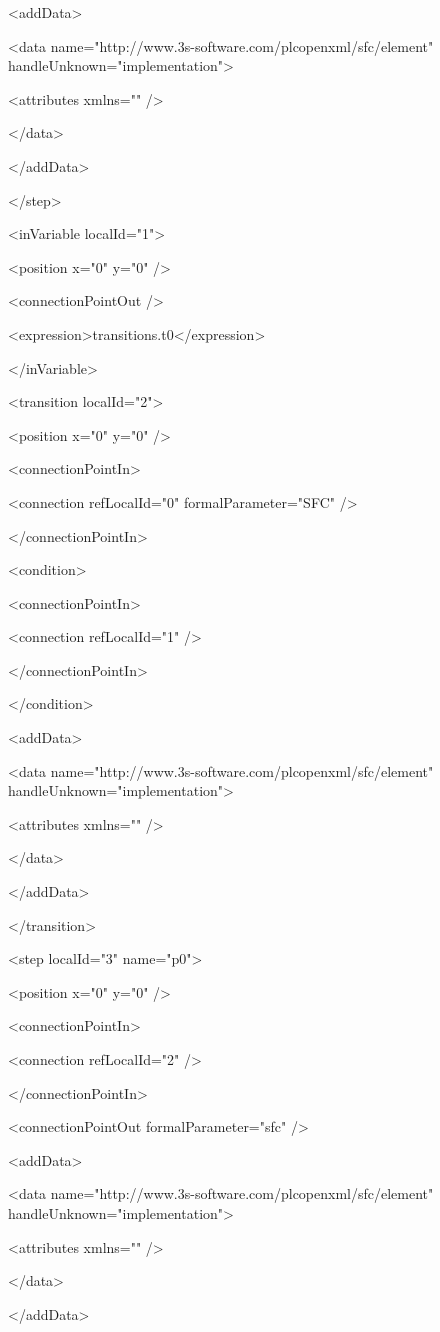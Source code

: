   <addData>

   <data name="http://www.3s-software.com/plcopenxml/sfc/element" handleUnknown="implementation">

    <attributes xmlns="" />

   </data>

  </addData>

 </step>

 <inVariable localId="1">

  <position x="0" y="0" />

  <connectionPointOut />

  <expression>transitions.t0</expression>

 </inVariable>

 <transition localId="2">

  <position x="0" y="0" />

  <connectionPointIn>

   <connection refLocalId="0" formalParameter="SFC" />

  </connectionPointIn>

  <condition>

   <connectionPointIn>

    <connection refLocalId="1" />

   </connectionPointIn>

  </condition>

  <addData>

   <data name="http://www.3s-software.com/plcopenxml/sfc/element" handleUnknown="implementation">

    <attributes xmlns="" />

   </data>

  </addData>

 </transition>

 <step localId="3" name="p0">

  <position x="0" y="0" />

  <connectionPointIn>

   <connection refLocalId="2" />

  </connectionPointIn>

  <connectionPointOut formalParameter="sfc" />

  <addData>

   <data name="http://www.3s-software.com/plcopenxml/sfc/element" handleUnknown="implementation">

    <attributes xmlns="" />

   </data>

  </addData>

